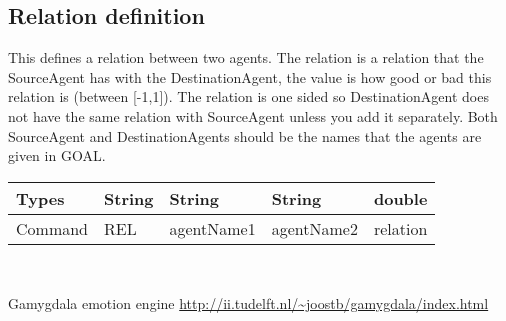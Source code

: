 \documentclass{scrartcl}
\begin{document}
\subsection{Relation definition}
This defines a relation between two agents. The relation is a relation that the SourceAgent has with the DestinationAgent, the value is how good or bad this relation is (between [-1,1]). The relation is one sided so DestinationAgent does not have the same relation with SourceAgent unless you add it separately. Both SourceAgent and DestinationAgents should be the names that the agents are given in GOAL.\\
\begin{tabular}{|l|l|l|l|l|}
	\hline  Types& String & String & String & double\\ 
	\hline  Command & REL & agentName1 & agentName2 & relation \\ 
	\hline 
\end{tabular} 
\\
\pagebreak
\begin{thebibliography}{9}	
	Gamygdala emotion engine
	\url{http://ii.tudelft.nl/~joostb/gamygdala/index.html}
\end{thebibliography}

 
\end{document}
